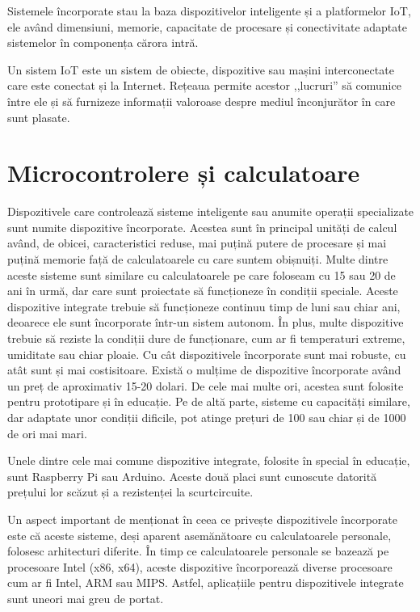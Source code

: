 Sistemele încorporate stau la baza dispozitivelor inteligente și a platformelor IoT, ele având dimensiuni, memorie, capacitate de procesare și conectivitate adaptate sistemelor în componența cărora intră.

Un sistem IoT este un sistem de obiecte, dispozitive sau mașini interconectate care este conectat și la Internet.
Rețeaua permite acestor ,,lucruri'' să comunice între ele și să furnizeze informații valoroase despre mediul înconjurător în care sunt plasate.

\section{Microcontrolere și calculatoare}
\label{sec:embed:micro-comp}

Dispozitivele care controlează sisteme inteligente sau anumite operații specializate sunt numite dispozitive încorporate.
Acestea sunt în principal unități de calcul având, de obicei, caracteristici reduse, mai puțină putere de procesare și mai puțină memorie față de calculatoarele cu care suntem obișnuiți.
Multe dintre aceste sisteme sunt similare cu calculatoarele pe care foloseam cu 15 sau 20 de ani în urmă, dar care sunt proiectate să funcționeze în condiții speciale.
Aceste dispozitive integrate trebuie să funcționeze continuu timp de luni sau chiar ani, deoarece ele sunt încorporate într-un sistem autonom.
În plus, multe dispozitive trebuie să reziste la condiții dure de funcționare, cum ar fi temperaturi extreme, umiditate sau chiar ploaie.
Cu cât dispozitivele încorporate sunt mai robuste, cu atât sunt și mai costisitoare.
Există o mulțime de dispozitive încorporate având un preț de aproximativ 15-20 dolari.
De cele mai multe ori, acestea sunt folosite pentru prototipare și în educație.
Pe de altă parte, sisteme cu capacități similare, dar adaptate unor condiții dificile, pot atinge prețuri de 100 sau chiar și de 1000 de ori mai mari.

Unele dintre cele mai comune dispozitive integrate, folosite în special în educație, sunt Raspberry Pi sau Arduino.
Aceste două placi sunt cunoscute datorită prețului lor scăzut și a rezistenței la scurtcircuite.

Un aspect important de menționat în ceea ce privește dispozitivele încorporate este că aceste sisteme, deși aparent asemănătoare cu calculatoarele personale, folosesc arhitecturi diferite.
În timp ce calculatoarele personale se bazează pe procesoare Intel (x86, x64), aceste dispozitive încorporează diverse procesoare cum ar fi Intel, ARM sau MIPS.
Astfel, aplicațiile pentru dispozitivele integrate sunt uneori mai greu de portat.

